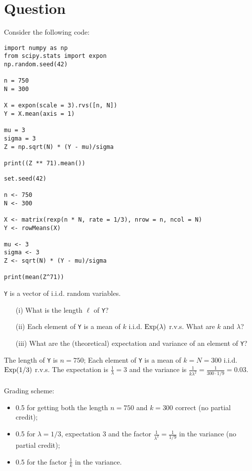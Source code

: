 \section{Question}

Consider the following code:

\begin{verbatim}
import numpy as np
from scipy.stats import expon
np.random.seed(42)

n = 750
N = 300

X = expon(scale = 3).rvs([n, N])
Y = X.mean(axis = 1)

mu = 3
sigma = 3
Z = np.sqrt(N) * (Y - mu)/sigma

print((Z ** 71).mean())
\end{verbatim}

\begin{verbatim}
set.seed(42)

n <- 750
N <- 300

X <- matrix(rexp(n * N, rate = 1/3), nrow = n, ncol = N)
Y <- rowMeans(X)

mu <- 3
sigma <- 3
Z <- sqrt(N) * (Y - mu)/sigma

print(mean(Z^71))
\end{verbatim}

\vspace*{20pt}


\begin{exercise}[1.5]
\texttt{Y} is a vector of i.i.d. random variables.

\begin{itemize}
\item[(i)] What is the length $\ell$ of \texttt{Y}?
\item[(ii)] Each element of \texttt{Y} is a mean of $k$ i.i.d. $\mathrm{Exp}(\lambda)$ r.v.s.
What are $k$ and $\lambda$?  
\item[(iii)] What are the (theoretical) expectation and variance of an element of \texttt{Y}? 
\end{itemize} 

\begin{solution}
The length of \texttt{Y} is $n = 750$;  Each element of \texttt{Y} is a mean of $k = N = 300$ i.i.d. $\mathrm{Exp}(1/3)$ r.v.s.
The expectation is $\frac1\lambda = 3$ and the variance is $\frac1{k \lambda^2} = \frac1{300\cdot1/9} = 0.03$. \\ \\
Grading scheme:
\begin{itemize}
\item 0.5 for getting both the length $n=750$ and  $k=300$ correct (no partial credit);
\item 0.5 for $\lambda = 1/3$, expectation $3$ and the factor $\frac1{\lambda^2} = \frac{1}{1/9}$ in the variance (no partial credit);
\item 0.5 for the factor $\frac1{k}$ in the variance.
\end{itemize}
\end{solution}
\end{exercise}

